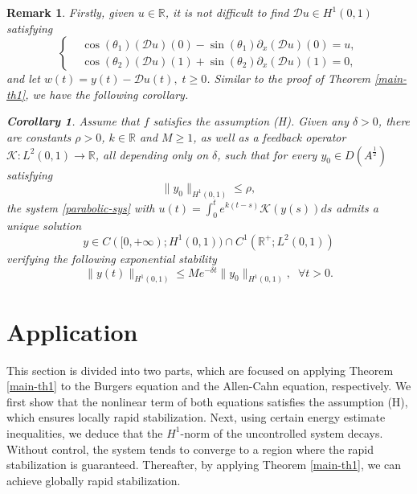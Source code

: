 \documentclass[review]{elsarticle}
\newtheorem{remark}[theorem]{Remark}
\newtheorem{corollary}[theorem]{Corollary}
\numberwithin{equation}{section}
\begin{document}
\begin{remark}
        Firstly, given $u\in \mathbb{R}$, it is not difficult to find $\mathcal{D}u\in H^1(0,1)$ satisfying
        $$\left\{\begin{array}{ll}
&\cos(\theta_1)(\mathcal{D}u)(0)-\sin(\theta_1)\partial_x (\mathcal{D}u)(0)=u,\\[2mm]
&\cos(\theta_2)(\mathcal{D}u)(1)+\sin(\theta_2)\partial_x (\mathcal{D}u)(1)=0,
\end{array}\right.$$and let $w(t)=y(t)-\mathcal{D} u(t),\; t\ge 0$. Similar to the proof of Theorem \ref{main-th1}, we have the following corollary.
        \begin{corollary}
     \label{co1}
  Assume that $f$ satisfies the assumption (H). Given any $\delta>0$, there are constants $\rho>0$, $k\in \mathbb{R}$ and $M\ge 1$, as well as a feedback operator $\mathcal{K}:L^2(0,1)\to\mathbb{R}$, all depending only on $\delta$, such that for every $y_0\in D(A^{\frac{1}{2}})$ satisfying
         \begin{equation*}
             \|y_0\|_{H^1(0,1)}\le \rho,
         \end{equation*}
        the system \eqref{parabolic-sys} with $u(t)=\int_0^t e^{k(t-s)}\mathcal{K}(y(s))ds$ admits a unique solution $$y\in C([0,+\infty);H^1(0,1))\cap 
 C^1(\mathbb{R}^+;L^2(0,1))  $$ verifying the following exponential stability
         \begin{equation*}
             \|y(t)\|_{H^1(0,1)}\le Me^{-\delta t}\|y_0\|_{H^1(0,1)},\;\;\forall t>0.
         \end{equation*}
\end{corollary}
\end{remark}

\section{Application}\label{sec5}
 This section is divided into two parts, which are focused on applying {Theorem \ref{main-th1}} to the Burgers equation and the Allen-Cahn equation, respectively. We first show that the nonlinear term of both equations satisfies the assumption (H), which ensures locally rapid stabilization. Next, using certain energy estimate inequalities, we deduce that the $H^1$-norm of the uncontrolled system decays. Without control, the system tends to converge to a region where the rapid stabilization is guaranteed. Thereafter, by applying Theorem \ref{main-th1}, we can achieve globally rapid stabilization.


 
\end{document}
